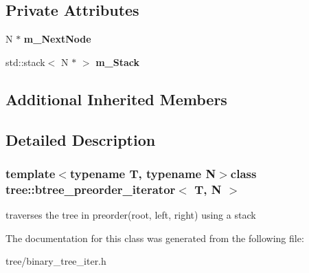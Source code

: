 \subsection*{Private Attributes}
\begin{DoxyCompactItemize}
\item 
\hypertarget{classtree_1_1btree__preorder__iterator_a142dc25e4c41f10c96cc738182d2eb18}{N $\ast$ {\bfseries m\-\_\-\-Next\-Node}}\label{classtree_1_1btree__preorder__iterator_a142dc25e4c41f10c96cc738182d2eb18}

\item 
\hypertarget{classtree_1_1btree__preorder__iterator_a790df750993384cb0c3056c0dd780cc0}{std\-::stack$<$ N $\ast$ $>$ {\bfseries m\-\_\-\-Stack}}\label{classtree_1_1btree__preorder__iterator_a790df750993384cb0c3056c0dd780cc0}

\end{DoxyCompactItemize}
\subsection*{Additional Inherited Members}


\subsection{Detailed Description}
\subsubsection*{template$<$typename T, typename N$>$class tree\-::btree\-\_\-preorder\-\_\-iterator$<$ T, N $>$}

traverses the tree in preorder(root, left, right) using a stack 

The documentation for this class was generated from the following file\-:\begin{DoxyCompactItemize}
\item 
tree/binary\-\_\-tree\-\_\-iter.\-h\end{DoxyCompactItemize}
